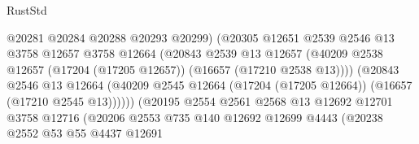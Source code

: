 \begin{lexlean}{RustStd}
\begin{coremodule}
                                        @20281
                                        @20284
                                        @20288
                                        @20293
                                        @20299)
                                      (@20305
                                        @12651
                                        @2539
                                        @2546
                                        @13
                                        @3758
                                        @12657
                                        @3758
                                        @12664
                                        (@20843
                                          @2539
                                          @13
                                          @12657
                                          (@40209
                                            @2538
                                            @12657
                                            (@17204 (@17205 @12657))
                                            (@16657 (@17210 @2538 @13))))
                                        (@20843
                                          @2546
                                          @13
                                          @12664
                                          (@40209
                                            @2545
                                            @12664
                                            (@17204 (@17205 @12664))
                                            (@16657 (@17210 @2545 @13))))))
                                    (@20195
                                      @2554
                                      @2561
                                      @2568
                                      @13
                                      @12692
                                      @12701
                                      @3758
                                      @12716
                                      (@20206
                                        @2553
                                        @735
                                        @140
                                        @12692
                                        @12699
                                        @4443
                                        (@20238
                                          @2552
                                          @53
                                          @55
                                          @4437
                                          @12691

\end{coremodule}
\end{lexlean}
